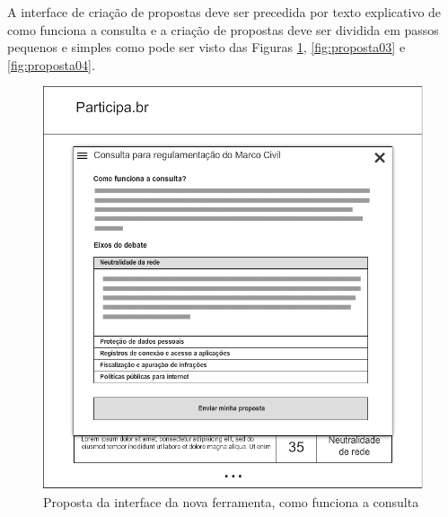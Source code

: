 \documentclass[12pt]{article}
\begin{document}
A interface de criação de propostas deve ser precedida por texto explicativo
de como funciona a consulta e a criação de propostas deve ser dividida em
passos pequenos e simples como pode ser visto das Figuras
\ref{fig:proposta02}, \ref{fig:proposta03} e \ref{fig:proposta04}.

\begin{figure}[h]
\center
\includegraphics[scale=0.5]{02_-_metodologia_e_eixos.png}
\caption{Proposta da interface da nova ferramenta, como funciona a consulta}
\label{fig:proposta02}
\end{figure}
\end{document}
